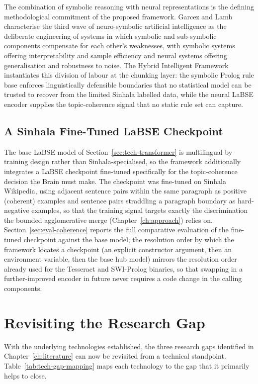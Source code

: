 \documentclass[12pt,a4paper,oneside]{report}
\begin{document}
The combination of symbolic reasoning with neural representations is the defining methodological commitment of the proposed framework. Garcez and Lamb \cite{garcez2022neurosymbolic} characterise the third wave of neuro-symbolic artificial intelligence as the deliberate engineering of systems in which symbolic and sub-symbolic components compensate for each other's weaknesses, with symbolic systems offering interpretability and sample efficiency and neural systems offering generalisation and robustness to noise. The Hybrid Intelligent Framework instantiates this division of labour at the chunking layer: the symbolic Prolog rule base enforces linguistically defensible boundaries that no statistical model can be trusted to recover from the limited Sinhala labelled data, while the neural LaBSE encoder supplies the topic-coherence signal that no static rule set can capture.

\subsection{A Sinhala Fine-Tuned LaBSE Checkpoint}
\label{sec:tech-labse-finetune}
The base LaBSE model of Section~\ref{sec:tech-transformer} is multilingual by training design rather than Sinhala-specialised, so the framework additionally integrates a LaBSE checkpoint fine-tuned specifically for the topic-coherence decision the Brain must make. The checkpoint was fine-tuned on Sinhala Wikipedia, using adjacent sentence pairs within the same paragraph as positive (coherent) examples and sentence pairs straddling a paragraph boundary as hard-negative examples, so that the training signal targets exactly the discrimination the bounded agglomerative merge (Chapter~\ref{ch:approach}) relies on. Section~\ref{sec:eval-coherence} reports the full comparative evaluation of the fine-tuned checkpoint against the base model; the resolution order by which the framework locates a checkpoint (an explicit constructor argument, then an environment variable, then the base hub model) mirrors the resolution order already used for the Tesseract and SWI-Prolog binaries, so that swapping in a further-improved encoder in future never requires a code change in the calling components.

\section{Revisiting the Research Gap}
\label{sec:tech-gap-revisit}
With the underlying technologies established, the three research gaps identified in Chapter~\ref{ch:literature} can now be revisited from a technical standpoint. Table~\ref{tab:tech-gap-mapping} maps each technology to the gap that it primarily helps to close.
\end{document}
